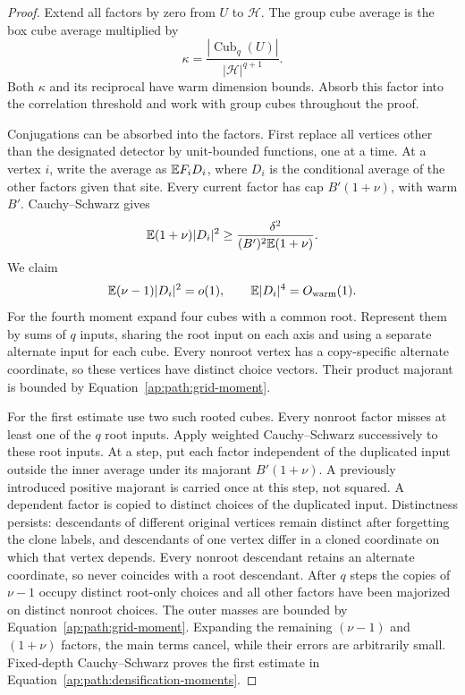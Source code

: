 \begin{proof}
Extend all factors by zero from $U$ to $\mathcal H$. The group
cube average is the box cube average multiplied by
\[
 \kappa=\frac{|\operatorname{Cub}_q(U)|}{|\mathcal H|^{q+1}}.
\]
Both $\kappa$ and its reciprocal have warm dimension bounds.
Absorb this factor into the correlation threshold and work with
group cubes throughout the proof.

Conjugations can be absorbed into the factors.  First replace all
vertices other than the designated detector by unit-bounded
functions, one at a time.  At a vertex $i$, write the average as
$\mathbb E F_i D_i$, where $D_i$ is the conditional average of the
other factors given that site.  Every current factor has cap
$B'(1+\nu)$, with warm $B'$.  Cauchy--Schwarz gives
\[
 \mathbb E(1+\nu)|D_i|^2
 \ge \frac{\delta^2}{(B')^2\mathbb E(1+\nu)}.
\]
We claim
\begin{equation}\label{ap:path:densification-moments}
 \mathbb E(\nu-1)|D_i|^2=o(1),\qquad
 \mathbb E|D_i|^4=O_{\rm warm}(1).
\end{equation}
For the fourth moment expand four cubes with a common root.
Represent them by sums of $q$ inputs, sharing the root input on
each axis and using a separate alternate input for each cube.
Every nonroot vertex has a copy-specific alternate coordinate,
so these vertices have distinct choice vectors.  Their product
majorant is bounded by Equation~\eqref{ap:path:grid-moment}.

For the first estimate use two such rooted cubes.  Every nonroot
factor misses at least one of the $q$ root inputs.  Apply weighted
Cauchy--Schwarz successively to these root inputs.  At a step,
put each factor independent of the duplicated input outside the
inner average under its majorant $B'(1+\nu)$.  A previously
introduced positive majorant is carried once at this step, not
squared.  A dependent factor is copied to distinct choices of
the duplicated input.  Distinctness persists: descendants of
different original vertices remain distinct after forgetting
the clone labels, and descendants of one vertex differ in a
cloned coordinate on which that vertex depends.  Every nonroot
descendant retains an alternate coordinate, so never coincides
with a root descendant.  After $q$ steps the copies of $\nu-1$
occupy distinct root-only choices and all other factors have
been majorized on distinct nonroot choices.  The outer masses
are bounded by Equation~\eqref{ap:path:grid-moment}.  Expanding
the remaining $(\nu-1)$ and $(1+\nu)$ factors, the main terms
cancel, while their errors are arbitrarily small.  Fixed-depth
Cauchy--Schwarz proves the first estimate in
Equation~\eqref{ap:path:densification-moments}.


\end{proof}
